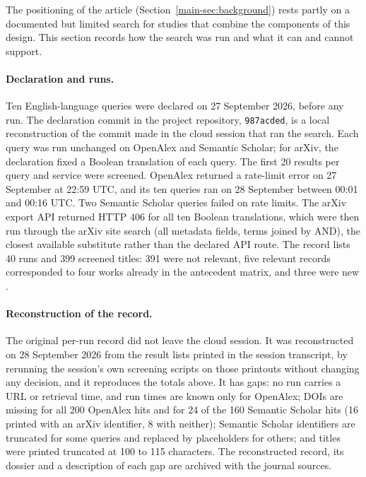 \label{supp:search-record}

The positioning of the article (Section~\ref{main-sec:background}) rests partly on a documented but limited search for studies that combine the components of this design. This section records how the search was run and what it can and cannot support.

\paragraph{Declaration and runs.}
Ten English-language queries were declared on 27 September 2026, before any run. The declaration commit in the project repository, \texttt{987acded}, is a local reconstruction of the commit made in the cloud session that ran the search. Each query was run unchanged on OpenAlex and Semantic Scholar; for arXiv, the declaration fixed a Boolean translation of each query. The first 20 results per query and service were screened. OpenAlex returned a rate-limit error on 27 September at 22:59 UTC, and its ten queries ran on 28 September between 00:01 and 00:16 UTC. Two Semantic Scholar queries failed on rate limits. The arXiv export API returned HTTP 406 for all ten Boolean translations, which were then run through the arXiv site search (all metadata fields, terms joined by AND), the closest available substitute rather than the declared API route. The record lists 40 runs and 399 screened titles: 391 were not relevant, five relevant records corresponded to four works already in the antecedent matrix, and three were new \cite{carpentras2022,xu2021sensitivity,advani2018credibly}.

\paragraph{Reconstruction of the record.}
The original per-run record did not leave the cloud session. It was reconstructed on 28 September 2026 from the result lists printed in the session transcript, by rerunning the session's own screening scripts on those printouts without changing any decision, and it reproduces the totals above. It has gaps: no run carries a URL or retrieval time, and run times are known only for OpenAlex; DOIs are missing for all 200 OpenAlex hits and for 24 of the 160 Semantic Scholar hits (16 printed with an arXiv identifier, 8 with neither); Semantic Scholar identifiers are truncated for some queries and replaced by placeholders for others; and titles were printed truncated at 100 to 115 characters. The reconstructed record, its dossier and a description of each gap are archived with the journal sources.


